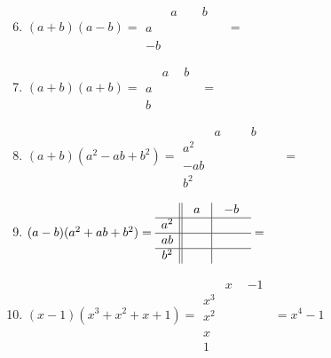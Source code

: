 \documentclass{article}
\def\ph#1{\phantom{#1}}
\begin{document}
     \begin{enumerate}
     \setcounter{enumi}{5}
     \item $(a+b)(a-b) = 
    \begin{array}{c||c|c}
     & a & b \\
     \hline
     a & \ph{a^2} & \ph{ab} \\
     \hline
     -b & \ph{-ab} & \ph{-b^2}
     \end{array} = 
     \ph{a^2-b^2}$
     
     \item $(a+b)(a+b) = 
    \begin{array}{c||c|c}
     & a & b \\
     \hline
     a & \ph{a^2} & \ph{ab} \\
     \hline
     b & \ph{ab} & \ph{b^2}
     \end{array} = 
     \ph{a^2+2ab+b^2}$
     
     \item $(a+b)(a^2-ab+b^2) = 
    \begin{array}{c||c|c}
     & a & b \\
     \hline
     a^2 & \ph{a^3} & \ph{a^2b} \\
     \hline
     -ab & \ph{-a^2b} & \ph{-ab^2} \\
     \hline
     b^2 & \ph{ab^2} & \ph{b^3}
     \end{array} = 
     \ph{a^3+b^3}$
     
     \item $(a-b)(a^2+ab+b^2) = 
    \begin{array}{c||c|c}
     & a & -b \\
     \hline
     a^2 & \ph{a^3} & \ph{{\color{red}{-a^2b}}} \\
     \hline
     ab & \ph{{\color{red}{a^2b}}} & \ph{{\color{green}{-ab^2}}} \\
     \hline
     b^2 & \ph{{\color{green}{ab^2}}} & \ph{-b^3}
     \end{array} = 
     \ph{a^3-b^3}$
     
     \item $(x-1)(x^3+x^2+x+1) = 
    \begin{array}{c||c|c}
     & x & -1 \\
     \hline
     x^3 & \ph{x^4} & \ph{-x^3} \\
     \hline
     x^2 & \ph{x^3} & \ph{-x^2} \\
     \hline
     x & \ph{x^2} & \ph{-x} \\
     \hline
     1 & \ph{x} & \ph{-1}
     \end{array} = 
     x^4-1$
     

\end{enumerate}
\end{document}
